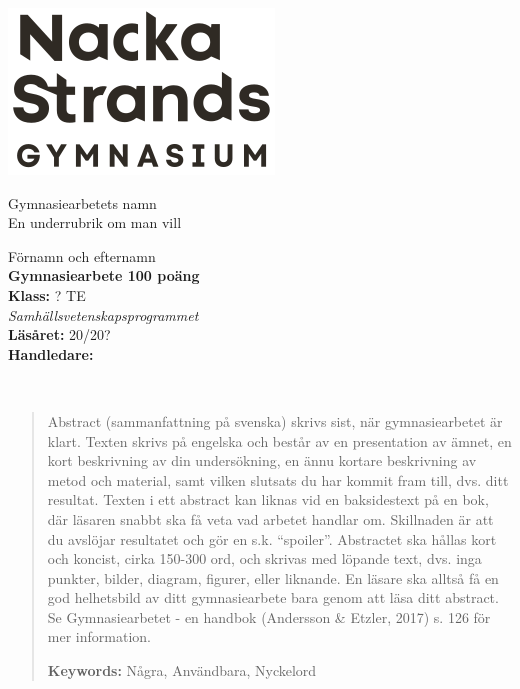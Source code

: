 \documentclass[11pt, a4paper, titlepage]{article}
\begin{document}
	\begin{titlepage}
		\noindent
		\includegraphics[width=0.15\paperwidth]{logo-mg.png} %
		
		\vspace*{0.5\paperwidth}
		\noindent\hspace*{0.15\paperwidth}
		\begin{minipage}{\textwidth}
		
			\color[HTML]{0b5394}\Huge Gymnasiearbetets namn \\
			\color{black}\Large En underrubrik om man vill \\
		\end{minipage}
	
		\vfill %
		\noindent
		\begin{minipage}{\textwidth}
			\normalsize %
			Förnamn och efternamn \\
			\textbf{Gymnasiearbete 100 poäng} \\
			\textbf{Klass:} ? TE \\
			\textit{Samhällsvetenskapsprogrammet} \\
			\textbf{Läsåret:} 20/20? \\
			\textbf{Handledare:}
		\end{minipage}
	\end{titlepage}
	\newpage \ \newpage
	\begin{abstract}
		Abstract (sammanfattning på svenska) skrivs sist, när gymnasiearbetet är klart. Texten skrivs på engelska och består av en presentation av ämnet, en kort beskrivning av din undersökning, en ännu kortare beskrivning av metod och material, samt vilken slutsats du har kommit fram till, dvs. ditt resultat. Texten i ett abstract kan liknas vid en baksidestext på en bok, där läsaren snabbt ska få veta vad arbetet handlar om. Skillnaden är att du avslöjar resultatet och gör en s.k. “spoiler”. Abstractet ska hållas kort och koncist, cirka 150-300 ord, och skrivas med löpande text, dvs. inga punkter, bilder, diagram, figurer, eller liknande. En läsare ska alltså få en god helhetsbild av ditt gymnasiearbete bara genom att läsa ditt abstract.
		\newline\newline
		Se Gymnasiearbetet - en handbok (Andersson \& Etzler, 2017) s. 126 för mer information. 
		
		\begin{flushleft}
			{\small {\bf Keywords:} Några, Användbara, Nyckelord}
		\end{flushleft}
	\end{abstract}
\end{document}
